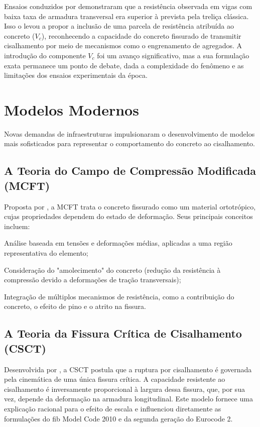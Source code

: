 \documentclass[
	12pt,				%
	openright,			%
	twoside,			%
	a4paper,			%
	chapter=TITLE,		%
	section=TITLE,		%
	subsection=TITLE,	%
	subsubsection=TITLE,%
	partnum=false,
	brazil,			%
]{abntex2}
\begin{document}
Ensaios conduzidos por \textcite{Leonhardt1964} demonstraram que a resistência observada em vigas com baixa taxa de armadura transversal era superior à prevista pela treliça clássica. Isso o levou a propor a inclusão de uma parcela de resistência atribuída ao concreto ($V_c$), reconhecendo a capacidade do concreto fissurado de transmitir cisalhamento por meio de mecanismos como o engrenamento de agregados. A introdução do componente $V_c$ foi um avanço significativo, mas a sua formulação exata permanece um ponto de debate, dada a complexidade do fenômeno e as limitações dos ensaios experimentais da época.

\section{Modelos Modernos}
Novas demandas de infraestruturas impulsionaram o desenvolvimento de modelos mais sofisticados para representar o comportamento do concreto ao cisalhamento.

\subsection{A Teoria do Campo de Compressão Modificada (MCFT)}
Proposta por \textcite{Vecchio1986}, a MCFT trata o concreto fissurado como um material ortotrópico, cujas propriedades dependem do estado de deformação. Seus principais conceitos incluem:
\begin{alineas}
    \item Análise baseada em tensões e deformações médias, aplicadas a uma região representativa do elemento;
    \item Consideração do "amolecimento" do concreto (redução da resistência à compressão devido a deformações de tração transversais);
    \item Integração de múltiplos mecanismos de resistência, como a contribuição do concreto, o efeito de pino e o atrito na fissura.
\end{alineas}

\subsection{A Teoria da Fissura Crítica de Cisalhamento (CSCT)}
Desenvolvida por \textcite{Muttoni2017}, a CSCT postula que a ruptura por cisalhamento é governada pela cinemática de uma única fissura crítica. A capacidade resistente ao cisalhamento é inversamente proporcional à largura dessa fissura, que, por sua vez, depende da deformação na armadura longitudinal. Este modelo fornece uma explicação racional para o efeito de escala e influenciou diretamente as formulações do fib Model Code 2010 e da segunda geração do Eurocode 2.
\end{document}
